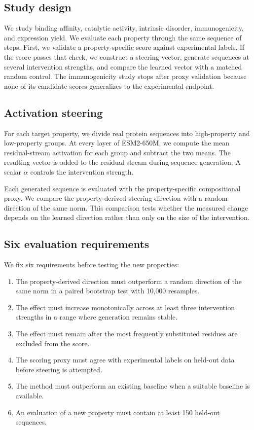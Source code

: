 \documentclass{article}
\begin{document}
\subsection{Study design}

We study binding affinity, catalytic activity, intrinsic disorder,
immunogenicity, and expression yield. We evaluate each property through
the same sequence of steps. First, we validate a property-specific score
against experimental labels. If the score passes that check, we
construct a steering vector, generate sequences at several intervention
strengths, and compare the learned vector with a matched random control.
The immunogenicity study stops after proxy validation because none of
its candidate scores generalizes to the experimental endpoint.

\subsection{Activation steering}

For each target property, we divide real protein sequences into
high-property and low-property groups. At every layer of ESM2-650M, we
compute the mean residual-stream activation for each group and subtract
the two means. The resulting vector is added to the residual stream
during sequence generation. A scalar $\alpha$ controls the intervention
strength.

Each generated sequence is evaluated with the property-specific
compositional proxy. We compare the property-derived steering direction
with a random direction of the same norm. This comparison tests whether
the measured change depends on the learned direction rather than only on
the size of the intervention.

\subsection{Six evaluation requirements}

We fix six requirements before testing the new properties:

\begin{enumerate}
\item The property-derived direction must outperform a random direction
  of the same norm in a paired bootstrap test with 10,000 resamples.
\item The effect must increase monotonically across at least three
  intervention strengths in a range where generation remains stable.
\item The effect must remain after the most frequently substituted
  residues are excluded from the score.
\item The scoring proxy must agree with experimental labels on held-out
  data before steering is attempted.
\item The method must outperform an existing baseline when a suitable
  baseline is available.
\item An evaluation of a new property must contain at least 150 held-out
  sequences.
\end{enumerate}
\end{document}
